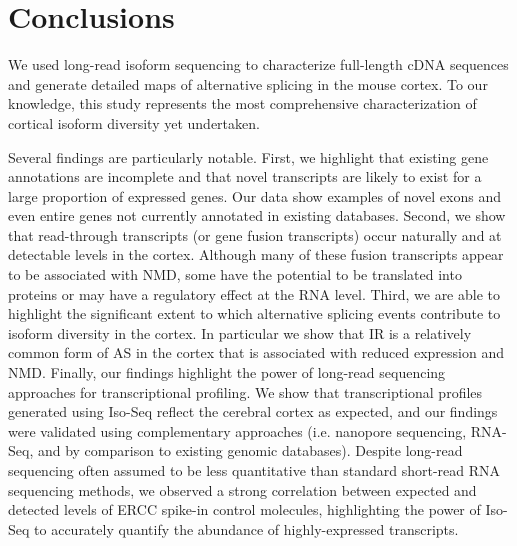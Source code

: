 \newpage
\section{Conclusions}
We used long-read isoform sequencing to characterize full-length cDNA sequences and generate detailed maps of alternative splicing in the mouse cortex. To our knowledge, this study represents the most comprehensive characterization of cortical isoform diversity yet undertaken. 

Several findings are particularly notable. First, we highlight that existing gene annotations are incomplete and that novel transcripts are likely to exist for a large proportion of expressed genes. Our data show examples of novel exons and even entire genes not currently annotated in existing databases. Second, we show that read-through transcripts (or gene fusion transcripts) occur naturally\cite{Mehani2020} and at detectable levels in the cortex. Although many of these fusion transcripts appear to be associated with NMD, some have the potential to be translated into proteins or may have a regulatory effect at the RNA level. Third, we are able to highlight the significant extent to which alternative splicing events contribute to isoform diversity in the cortex. In particular we show that IR is a relatively common form of AS in the cortex that is associated with reduced expression and NMD. Finally, our findings highlight the power of long-read sequencing approaches for transcriptional profiling. We show that transcriptional profiles generated using Iso-Seq reflect the cerebral cortex as expected, and our findings were validated using complementary approaches (i.e. nanopore sequencing, RNA-Seq, and by comparison to existing genomic databases). Despite long-read sequencing often assumed to be less quantitative than standard short-read RNA sequencing methods\cite{Zhao2019}, we observed a strong correlation between expected and detected levels of ERCC spike-in control molecules, highlighting the power of Iso-Seq to accurately quantify the abundance of highly-expressed transcripts.

